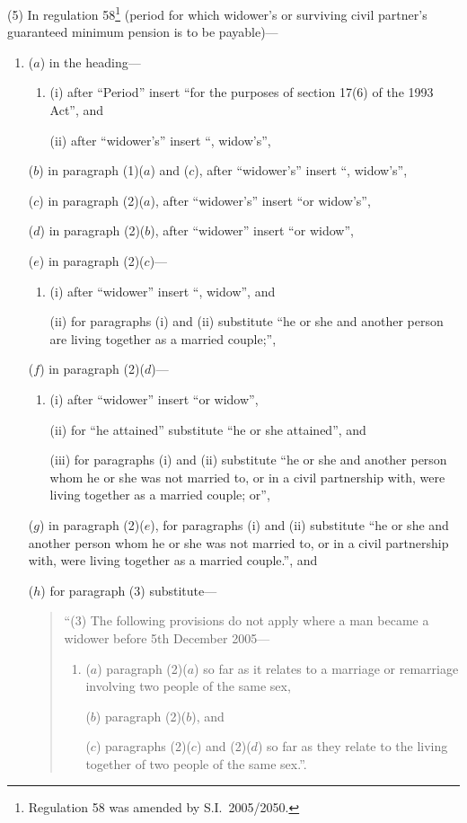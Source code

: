 \documentclass[12pt,a4paper]{article}
\begin{document}
(5) In regulation 58\footnote{Regulation 58 was amended by S.I.~2005/2050.} (period for which widower’s or surviving civil partner’s guaranteed minimum pension is to be payable)—
\begin{enumerate}\item[]
($a$) in the heading—
\begin{enumerate}\item[]
(i) after “Period” insert “for the purposes of section 17(6) of the 1993 Act”, and

(ii) after “widower’s” insert “, widow’s”,
\end{enumerate}

($b$) in paragraph (1)($a$)  and ($c$), after “widower’s” insert “, widow’s”,

($c$) in paragraph (2)($a$), after “widower’s” insert “or widow’s”,

($d$) in paragraph (2)($b$), after “widower” insert “or widow”,

($e$) in paragraph (2)($c$)—
\begin{enumerate}\item[]
(i) after “widower” insert “, widow”, and

(ii) for paragraphs (i)  and (ii)  substitute “he or she and another person are living together as a married couple;”,
\end{enumerate}

($f$) in paragraph (2)($d$)—
\begin{enumerate}\item[]
(i) after “widower” insert “or widow”,

(ii) for “he attained” substitute “he or she attained”, and

(iii) for paragraphs (i)  and (ii)  substitute “he or she and another person whom he or she was not married to, or in a civil partnership with, were living together as a married couple; or”,
\end{enumerate}

($g$) in paragraph (2)($e$), for paragraphs (i)  and (ii)  substitute “he or she and another person whom he or she was not married to, or in a civil partnership with, were living together as a married couple.”, and

($h$) for paragraph (3) substitute—
\begin{quotation}
“(3) The following provisions do not apply where a man became a widower before 5th December 2005—
\begin{enumerate}\item[]
($a$) paragraph (2)($a$)  so far as it relates to a marriage or remarriage involving two people of the same sex,

($b$) paragraph (2)($b$), and

($c$) paragraphs (2)($c$)  and (2)($d$)  so far as they relate to the living together of two people of the same sex.”.
\end{enumerate}
\end{quotation}
\end{enumerate}
\end{document}
